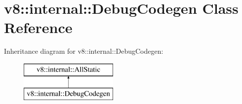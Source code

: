 \hypertarget{classv8_1_1internal_1_1_debug_codegen}{}\section{v8\+:\+:internal\+:\+:Debug\+Codegen Class Reference}
\label{classv8_1_1internal_1_1_debug_codegen}
Inheritance diagram for v8\+:\+:internal\+:\+:Debug\+Codegen\+:\begin{figure}[H]
\begin{center}
\leavevmode
\includegraphics[height=2.000000cm]{classv8_1_1internal_1_1_debug_codegen}
\end{center}
\end{figure}

